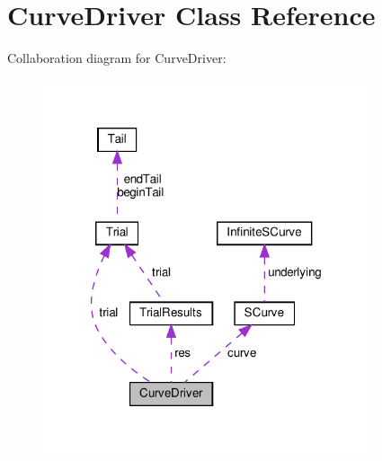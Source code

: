\hypertarget{classCurveDriver}{}\section{Curve\+Driver Class Reference}
\label{classCurveDriver}


Collaboration diagram for Curve\+Driver\+:\nopagebreak
\begin{figure}[H]
\begin{center}
\leavevmode
\includegraphics[width=273pt]{classCurveDriver__coll__graph}
\end{center}
\end{figure}
